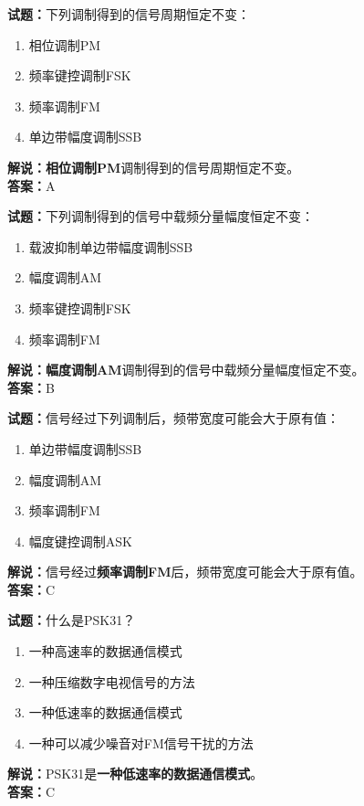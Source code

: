 \documentclass{ctexbook}
\begin{document}
\bigskip


\noindent\textbf{试题：}下列调制得到的信号周期恒定不变：
\begin{enumerate}[leftmargin=3em]
\item 相位调制PM
\item 频率键控调制FSK
\item 频率调制FM
\item 单边带幅度调制SSB
\end{enumerate}
\noindent\textbf{解说：}\textbf{相位调制PM}调制得到的信号周期恒定不变。\\\noindent\textbf{答案：}A




\bigskip


\noindent\textbf{试题：}下列调制得到的信号中载频分量幅度恒定不变：
\begin{enumerate}[leftmargin=3em]
\item 载波抑制单边带幅度调制SSB
\item 幅度调制AM
\item 频率键控调制FSK
\item 频率调制FM
\end{enumerate}
\noindent\textbf{解说：}\textbf{幅度调制AM}调制得到的信号中载频分量幅度恒定不变。\\\noindent\textbf{答案：}B




\bigskip


\noindent\textbf{试题：}信号经过下列调制后，频带宽度可能会大于原有值：
\begin{enumerate}[leftmargin=3em]
\item 单边带幅度调制SSB
\item 幅度调制AM
\item 频率调制FM
\item 幅度键控调制ASK
\end{enumerate}
\noindent\textbf{解说：}信号经过\textbf{频率调制FM}后，频带宽度可能会大于原有值。\\\noindent\textbf{答案：}C



\bigskip


\noindent\textbf{试题：}什么是PSK31？
\begin{enumerate}[leftmargin=3em]
\item 一种高速率的数据通信模式
\item 一种压缩数字电视信号的方法
\item 一种低速率的数据通信模式
\item 一种可以减少噪音对FM信号干扰的方法
\end{enumerate}
\noindent\textbf{解说：}PSK31是\textbf{一种低速率的数据通信模式}。\\\noindent\textbf{答案：}C
\end{document}
